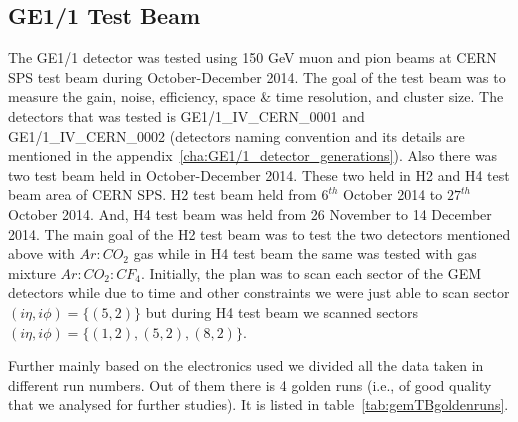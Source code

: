 
\subsection{GE1/1 Test Beam}
The GE1/1 detector was tested using 150 GeV muon and pion beams at CERN SPS test beam during October-December 2014. 
The goal of the test beam was to measure the gain, noise, efficiency, space \& time resolution, and cluster size. 
The detectors that was tested is GE1/1\_IV\_CERN\_0001 and GE1/1\_IV\_CERN\_0002 (detectors naming convention and its details are mentioned in the appendix~\ref{cha:GE1/1_detector_generations}).
Also there was two test beam held in October-December 2014. These two held in H2 and H4 test beam area of CERN SPS.
H2 test beam held from $6^{th}$ October 2014 to $27^{th}$ October 2014. And, H4 test beam was held from 26 November to 14 December 2014.
The main goal of the H2 test beam was to test the two detectors mentioned above with $Ar:CO_2$ gas while in H4 test beam the same was tested with gas mixture $Ar:CO_2:CF_4$.
Initially, the plan was to scan each sector of the GEM detectors while due to time and other constraints we were just able to scan sector $(i\eta, i\phi)=\{(5,2)\}$ but during H4 test beam we scanned sectors $(i\eta,i\phi)=\{(1,2),(5,2),(8,2)\}$.  

Further mainly based on the electronics used we divided all the data taken in different run numbers. Out of them there is 4 golden runs (i.e., of good quality that we analysed for further studies). It is listed in table~\ref{tab:gemTBgoldenruns}.

